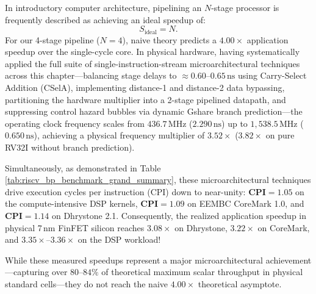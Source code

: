 In introductory computer architecture, pipelining an $N$-stage processor is frequently described as achieving an ideal speedup of:
\begin{equation}
S_{\text{ideal}} = N.
\end{equation}
For our 4-stage pipeline ($N = 4$), naive theory predicts a $4.00\times$ application speedup over the single-cycle core. In physical hardware, having systematically applied the full suite of single-instruction-stream microarchitectural techniques across this chapter---balancing stage delays to $\approx 0.60\text{--}0.65\,\text{ns}$ using Carry-Select Addition (CSelA), implementing distance-1 and distance-2 data bypassing, partitioning the hardware multiplier into a 2-stage pipelined datapath, and suppressing control hazard bubbles via dynamic Gshare branch prediction---the operating clock frequency scales from $436.7\,\text{MHz}$ ($2.290\,\text{ns}$) up to $1,538.5\,\text{MHz}$ ($0.650\,\text{ns}$), achieving a physical frequency multiplier of $\mathbf{3.52\times}$ ($3.82\times$ on pure RV32I without branch prediction).

Simultaneously, as demonstrated in Table \ref{tab:riscv_bp_benchmark_grand_summary}, these microarchitectural techniques drive execution cycles per instruction (CPI) down to near-unity: $\mathbf{\text{CPI} = 1.05}$ on the compute-intensive DSP kernels, $\mathbf{\text{CPI} = 1.09}$ on EEMBC CoreMark 1.0, and $\mathbf{\text{CPI} = 1.14}$ on Dhrystone 2.1. Consequently, the realized application speedup in physical 7\,nm FinFET silicon reaches $\mathbf{3.08\times}$ on Dhrystone, $\mathbf{3.22\times}$ on CoreMark, and $\mathbf{3.35\times\text{--}3.36\times}$ on the DSP workload!

While these measured speedups represent a major microarchitectural achievement---capturing over $80\text{--}84\%$ of theoretical maximum scalar throughput in physical standard cells---they do not reach the naive $4.00\times$ theoretical asymptote. 

